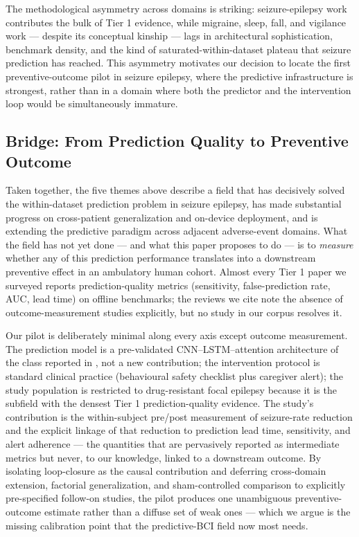 The methodological asymmetry across domains is striking: seizure-epilepsy work contributes the bulk of Tier 1 evidence, while migraine, sleep, fall, and vigilance work --- despite its conceptual kinship --- lags in architectural sophistication, benchmark density, and the kind of saturated-within-dataset plateau that seizure prediction has reached. This asymmetry motivates our decision to locate the first preventive-outcome pilot in seizure epilepsy, where the predictive infrastructure is strongest, rather than in a domain where both the predictor and the intervention loop would be simultaneously immature.

\subsection{Bridge: From Prediction Quality to Preventive Outcome}
\label{sec:rw-bridge}

Taken together, the five themes above describe a field that has decisively solved the within-dataset prediction problem in seizure epilepsy, has made substantial progress on cross-patient generalization and on-device deployment, and is extending the predictive paradigm across adjacent adverse-event domains. What the field has not yet done --- and what this paper proposes to do --- is to \emph{measure} whether any of this prediction performance translates into a downstream preventive effect in an ambulatory human cohort. Almost every Tier 1 paper we surveyed reports prediction-quality metrics (sensitivity, false-prediction rate, AUC, lead time) on offline benchmarks; the reviews we cite \cite{WuEtAl2025,TanEtAl2025,RenEtAl2022,WesalEtAl2026,WongEtAl2023,YimanWenqi2025,CostaEtAl2024,QamarEtAl2025} note the absence of outcome-measurement studies explicitly, but no study in our corpus resolves it.

Our pilot is deliberately minimal along every axis except outcome measurement. The prediction model is a pre-validated CNN--LSTM--attention architecture of the class reported in \cite{CaoEtAl2026,AlkhrijahEtAl2025,LiEtAl2025b}, not a new contribution; the intervention protocol is standard clinical practice (behavioural safety checklist plus caregiver alert); the study population is restricted to drug-resistant focal epilepsy because it is the subfield with the densest Tier 1 prediction-quality evidence. The study's contribution is the within-subject pre/post measurement of seizure-rate reduction and the explicit linkage of that reduction to prediction lead time, sensitivity, and alert adherence --- the quantities that are pervasively reported as intermediate metrics but never, to our knowledge, linked to a downstream outcome. By isolating loop-closure as the causal contribution and deferring cross-domain extension, factorial generalization, and sham-controlled comparison to explicitly pre-specified follow-on studies, the pilot produces one unambiguous preventive-outcome estimate rather than a diffuse set of weak ones --- which we argue is the missing calibration point that the predictive-BCI field now most needs.
